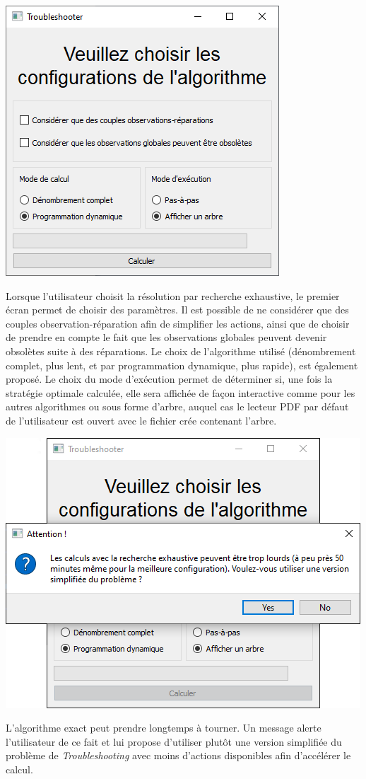 \documentclass[a4paper,11pt]{article}
\theoremstyle{plain}
\theoremstyle{definition}
\begin{document}
\begin{center}
\includegraphics[scale=0.667]{Figures/exato_1}
\end{center}
Lorsque l'utilisateur choisit la résolution par recherche exhaustive, le premier écran permet de choisir des paramètres. Il est possible de ne considérer que des couples observation-réparation afin de simplifier les actions, ainsi que de choisir de prendre en compte le fait que les observations globales peuvent devenir obsolètes suite à des réparations. Le choix de l'algorithme utilisé (dénombrement complet, plus lent, et par programmation dynamique, plus rapide), est également proposé. Le choix du mode d'exécution permet de déterminer si, une fois la stratégie optimale calculée, elle sera affichée de façon interactive comme pour les autres algorithmes ou sous forme d'arbre, auquel cas le lecteur PDF par défaut de l'utilisateur est ouvert avec le fichier crée contenant l'arbre.

\begin{center}
\includegraphics[scale=0.667]{Figures/exato_popup}
\end{center}
L'algorithme exact peut prendre longtemps à tourner. Un message alerte l'utilisateur de ce fait et lui propose d'utiliser plutôt une version simplifiée du problème de \emph{Troubleshooting} avec moins d'actions disponibles afin d'accélérer le calcul.
\end{document}
